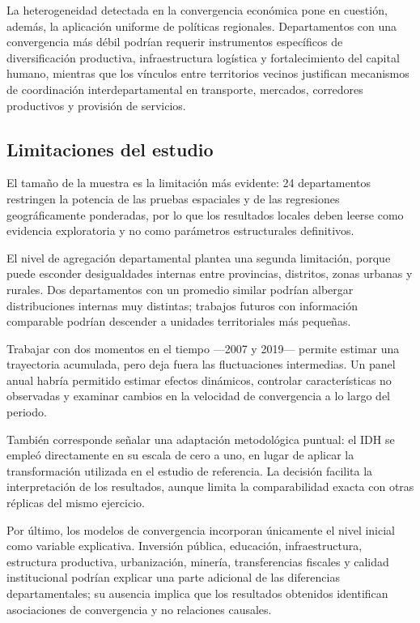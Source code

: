 La heterogeneidad detectada en la convergencia económica pone en cuestión,
además, la aplicación uniforme de políticas regionales. Departamentos con
una convergencia más débil podrían requerir instrumentos específicos de
diversificación productiva, infraestructura logística y fortalecimiento del
capital humano, mientras que los vínculos entre territorios vecinos
justifican mecanismos de coordinación interdepartamental en transporte,
mercados, corredores productivos y provisión de servicios.
 
\subsection{Limitaciones del estudio}
 
El tamaño de la muestra es la limitación más evidente: 24 departamentos
restringen la potencia de las pruebas espaciales y de las regresiones
geográficamente ponderadas, por lo que los resultados locales deben leerse
como evidencia exploratoria y no como parámetros estructurales definitivos.
 
El nivel de agregación departamental plantea una segunda limitación, porque
puede esconder desigualdades internas entre provincias, distritos, zonas
urbanas y rurales. Dos departamentos con un promedio similar podrían
albergar distribuciones internas muy distintas; trabajos futuros con
información comparable podrían descender a unidades territoriales más
pequeñas.
 
Trabajar con dos momentos en el tiempo —2007 y 2019— permite estimar una
trayectoria acumulada, pero deja fuera las fluctuaciones intermedias. Un
panel anual habría permitido estimar efectos dinámicos, controlar
características no observadas y examinar cambios en la velocidad de
convergencia a lo largo del periodo.
 
También corresponde señalar una adaptación metodológica puntual: el IDH se
empleó directamente en su escala de cero a uno, en lugar de aplicar la
transformación utilizada en el estudio de referencia. La decisión facilita
la interpretación de los resultados, aunque limita la comparabilidad exacta
con otras réplicas del mismo ejercicio.
 
Por último, los modelos de convergencia incorporan únicamente el nivel
inicial como variable explicativa. Inversión pública, educación,
infraestructura, estructura productiva, urbanización, minería,
transferencias fiscales y calidad institucional podrían explicar una parte
adicional de las diferencias departamentales; su ausencia implica que los
resultados obtenidos identifican asociaciones de convergencia y no
relaciones causales.
